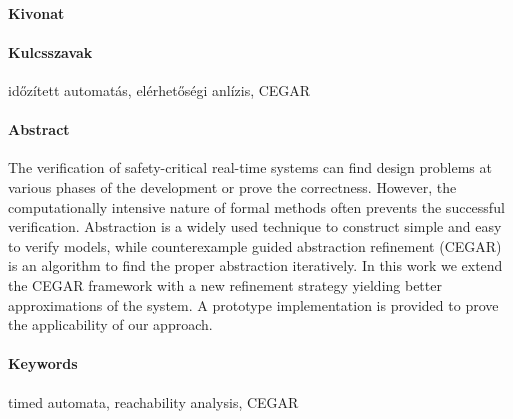 \begin{otherlanguage}{magyar}

  \paragraph*{Kivonat}
  \thispagestyle{plain}


  \paragraph{Kulcsszavak} időzített automatás, elérhetőségi anlízis, CEGAR
\end{otherlanguage}

\cleardoublepage

\paragraph*{Abstract}
{}
\thispagestyle{plain}

The verification of safety-critical real-time systems can find design problems at various phases of the development or prove the correctness. However, 
the computationally intensive nature of formal methods often prevents the successful verification. Abstraction is a widely used technique to construct simple and easy to verify models, while counterexample guided abstraction refinement (CEGAR) is an algorithm to find the proper abstraction iteratively. In this work we extend the CEGAR framework with a new refinement strategy yielding better approximations of the system. A prototype implementation is provided to prove the applicability of our approach.


\paragraph{Keywords} timed automata, reachability analysis,
CEGAR
